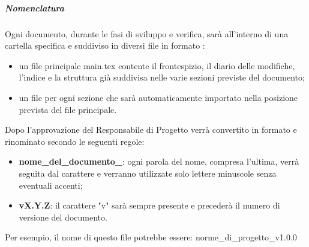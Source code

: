     	\subparagraph{Nomenclatura}
    	Ogni documento, durante le fasi di sviluppo e verifica, sarà all'interno di una cartella specifica e suddiviso in diversi file in formato \glock{\LaTeX}:
    	\begin{itemize}
    		\item un file principale main.tex contente il frontespizio, il diario delle modifiche, l'indice e la struttura già suddivisa nelle varie sezioni previste del documento;
    		\item un file per ogni sezione che sarà automaticamente importato nella posizione prevista del file principale.
    	\end{itemize}
    	Dopo l'approvazione del Responsabile di Progetto verrà convertito in formato  e rinominato secondo le seguenti regole:
    	\begin{itemize}
    		\item \textbf{nome\_del\_documento\_}: ogni parola del nome, compresa l'ultima, verrà seguita dal carattere  e verranno utilizzate solo lettere minuscole senza eventuali accenti;
    		\item \textbf{vX.Y.Z}: il carattere "v" sarà sempre presente e precederà il numero di versione del documento.
    	\end{itemize}
    	Per esempio, il nome di questo file potrebbe essere: norme\_di\_progetto\_v1.0.0\\

